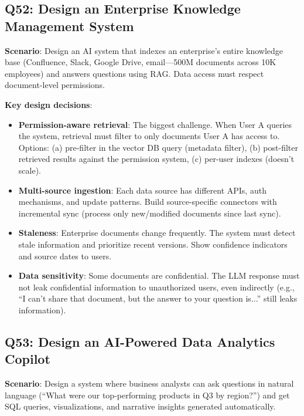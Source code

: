 \subsection{Q52: Design an Enterprise Knowledge Management System}

\textbf{Scenario}: Design an AI system that indexes an enterprise's entire knowledge base (Confluence, Slack, Google Drive, email---500M documents across 10K employees) and answers questions using RAG. Data access must respect document-level permissions.

\textbf{Key design decisions}:
\begin{itemize}[leftmargin=*]
    \item \textbf{Permission-aware retrieval}: The biggest challenge. When User A queries the system, retrieval must filter to only documents User A has access to. Options: (a) pre-filter in the vector DB query (metadata filter), (b) post-filter retrieved results against the permission system, (c) per-user indexes (doesn't scale).
    \item \textbf{Multi-source ingestion}: Each data source has different APIs, auth mechanisms, and update patterns. Build source-specific connectors with incremental sync (process only new/modified documents since last sync).
    \item \textbf{Staleness}: Enterprise documents change frequently. The system must detect stale information and prioritize recent versions. Show confidence indicators and source dates to users.
    \item \textbf{Data sensitivity}: Some documents are confidential. The LLM response must not leak confidential information to unauthorized users, even indirectly (e.g., ``I can't share that document, but the answer to your question is...'' still leaks information).
\end{itemize}

\subsection{Q53: Design an AI-Powered Data Analytics Copilot}

\textbf{Scenario}: Design a system where business analysts can ask questions in natural language (``What were our top-performing products in Q3 by region?'') and get SQL queries, visualizations, and narrative insights generated automatically.

